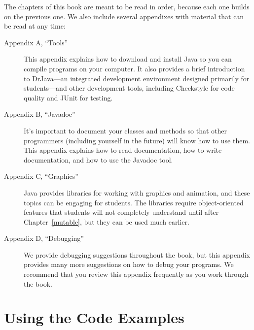 The chapters of this book are meant to be read in order, because each one builds on the previous one.
We also include several appendixes with material that can be read at any time:

\begin{description}

\item[Appendix A, ``Tools''] \hfill

This appendix explains how to download and install Java so you can compile programs on your computer.
It also provides a brief introduction to DrJava---an integrated development environment designed primarily for students---and other development tools, including Checkstyle for code quality and JUnit for testing.

\item[Appendix B, ``Javadoc''] \hfill

It's important to document your classes and methods so that other programmers (including yourself in the future) will know how to use them.
This appendix explains how to read documentation, how to write documentation, and how to use the Javadoc tool.

\item[Appendix C, ``Graphics''] \hfill

Java provides libraries for working with graphics and animation, and these topics can be engaging for students.
The libraries require object-oriented features that students will not completely understand until after Chapter~\ref{mutable}, but they can be used much earlier.

\item[Appendix D, ``Debugging''] \hfill

We provide debugging suggestions throughout the book, but this appendix provides many more suggestions on how to debug your programs.
We recommend that you review this appendix frequently as you work through the book.

%

\end{description}


\section*{Using the Code Examples}
\label{code}

